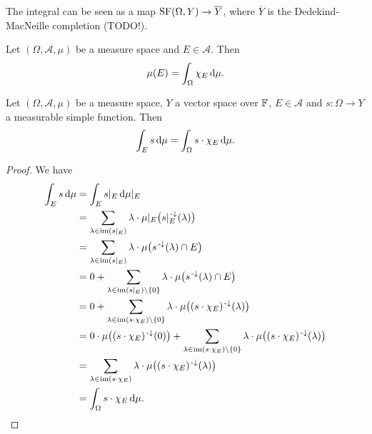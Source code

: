 The integral can be seen as a map $\operatorname{SF}(\Omega,Y)\to \overline{Y}$, where $\overline{Y}$ is the Dedekind-MacNeille completion (TODO!).

\begin{lemma} \label{measureFromIntegralCharacteristicFunctions}
Let $(\Omega, \mathcal{A}, \mu)$ be a measure space and $E\in\mathcal{A}$. Then
\[ \mu(E) = \int_\Omega \chi_E \operatorname{d \!}{\mu}. \]
\end{lemma}

\begin{lemma} \label{simpleIntegralOverSubset}
Let $(\Omega, \mathcal{A}, \mu)$ be a measure space, $Y$ a vector space over $\mathbb{F}$, $E\in\mathcal{A}$ and $s:\Omega\to Y$ a measurable simple function. Then
\[ \int_E s \operatorname{d \!}{\mu} = \int_\Omega s\cdot\chi_{E} \operatorname{d \!}{\mu}. \]
\end{lemma}
\begin{proof}
We have
\begin{align*}
\int_E s \operatorname{d \!}{\mu} &= \int_E s|_E \operatorname{d \!}{\mu|_E}\\
&= \sum_{\lambda \in \operatorname{im}(s|_E)}\lambda\cdot \mu|_E\big(s|_E^{{\text{\hspace{0.15em}-}\downarrow}}(\lambda)\big) \\
&= \sum_{\lambda \in \operatorname{im}(s|_E)}\lambda\cdot \mu\big(s^{{\text{\hspace{0.15em}-}\downarrow}}(\lambda)\cap E\big) \\
&= 0 + \sum_{\lambda \in \operatorname{im}(s|_E)\setminus\{0\}}\lambda\cdot \mu\big(s^{{\text{\hspace{0.15em}-}\downarrow}}(\lambda)\cap E\big) \\
&= 0 + \sum_{\lambda \in \operatorname{im}(s\cdot \chi_E)\setminus\{0\}}\lambda\cdot \mu\big((s\cdot \chi_E)^{{\text{\hspace{0.15em}-}\downarrow}}(\lambda)\big) \\
&= 0\cdot \mu\big((s\cdot \chi_E)^{{\text{\hspace{0.15em}-}\downarrow}}(0)\big) + \sum_{\lambda \in \operatorname{im}(s\cdot \chi_E)\setminus\{0\}}\lambda\cdot \mu\big((s\cdot \chi_E)^{{\text{\hspace{0.15em}-}\downarrow}}(\lambda)\big) \\
&= \sum_{\lambda \in \operatorname{im}(s\cdot \chi_E)}\lambda\cdot \mu\big((s\cdot \chi_E)^{{\text{\hspace{0.15em}-}\downarrow}}(\lambda)\big) \\
&= \int_\Omega s\cdot\chi_E \operatorname{d \!}{\mu}.
\end{align*}
\end{proof}


